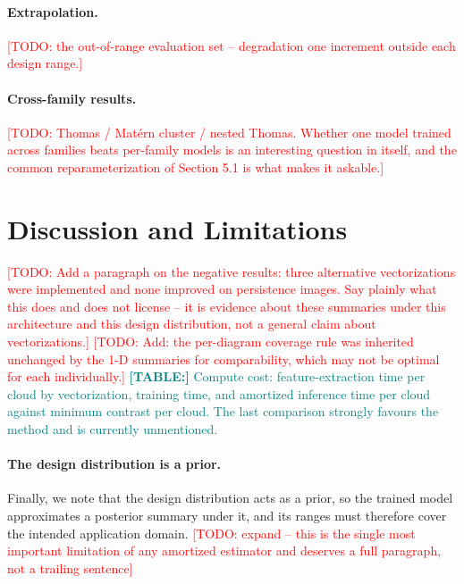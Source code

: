 \documentclass[11pt,letterpaper]{article}
\newcommand{\1}{\mathds{1}}
\newcommand{\todo}[1]{\textcolor{red}{[TODO: #1]}}
\newcommand{\fix}[1]{\textcolor{blue}{[FIX: #1]}}
\newcommand{\tab}[1]{\textcolor{teal}{\textbf{[TABLE:] }#1}}
\newcommand{\fig}[1]{\textcolor{magenta}{\textbf{[FIGURE:] }#1}}
\newcommand{\expt}[1]{\textcolor{orange}{\textbf{[EXPT:] }#1}}
\newcommand{\todo}[1]{}\newcommand{\fix}[1]{}
\newcommand{\tab}[1]{}\newcommand{\fig}[1]{}\newcommand{\expt}[1]{}
\theoremstyle{plain}
\theoremstyle{definitioncolon}
\begin{document}
\paragraph{Extrapolation.}
\todo{the out-of-range evaluation set -- degradation one increment outside each
design range.}

\paragraph{Cross-family results.}
\todo{Thomas / Mat\'ern cluster / nested Thomas. Whether one model trained across
families beats per-family models is an interesting question in itself, and the
common reparameterization of Section 5.1 is what makes it askable.}
\section{Discussion and Limitations}
\label{sec:discussion}

\todo{Add a paragraph on the negative results: three alternative vectorizations
were implemented and none improved on persistence images. Say plainly what this
does and does not license -- it is evidence about these summaries under this
architecture and this design distribution, not a general claim about
vectorizations.}
\todo{Add: the per-diagram coverage rule was inherited unchanged by the 1-D
summaries for comparability, which may not be optimal for each individually.}
\tab{Compute cost: feature-extraction time per cloud by vectorization, training
time, and amortized inference time per cloud against minimum contrast per cloud.
The last comparison strongly favours the method and is currently unmentioned.}

\paragraph{The design distribution is a prior.}
Finally, we note that the design distribution acts as a prior, so the trained
model approximates a posterior summary under it, and its ranges must therefore
cover the intended application domain.
\todo{expand -- this is the single most important limitation of any amortized
estimator and deserves a full paragraph, not a trailing sentence}
\end{document}
